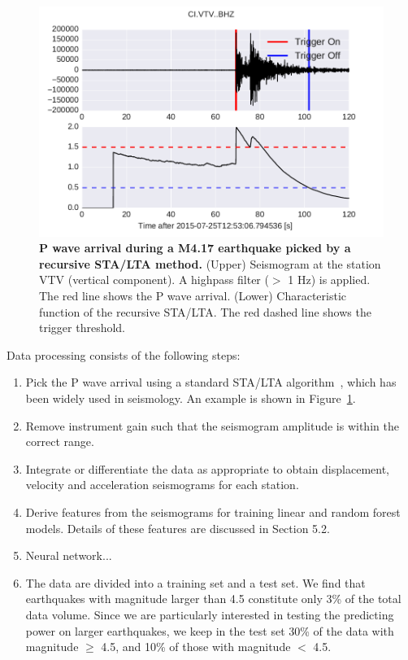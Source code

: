 \documentclass{article} %
\begin{document}
\begin{figure}[ht!]
	\centering
	\includegraphics*[scale=0.65, viewport= -25mm 0mm 500mm 100mm, angle=0]{./figure/sta_lta.pdf}
	\caption{{\bf P wave arrival during a M4.17 earthquake picked by a recursive STA/LTA method.} (Upper) Seismogram at the station VTV (vertical component). A highpass filter ($>$ 1 Hz) is applied. The red line shows the P wave arrival. (Lower) Characteristic function of the recursive STA/LTA. The red dashed line shows the trigger threshold.}\label{sta_lta} %
\end{figure}

Data processing consists of the following steps:

\begin{enumerate}
\item Pick the P wave arrival using a standard STA/LTA algorithm~\cite{Withers1998}, which has been widely used in seismology. An example is shown in Figure~\ref{sta_lta}. 
\item Remove instrument gain such that the seismogram amplitude is within the correct range.
\item Integrate or differentiate the data as appropriate to obtain displacement, velocity and acceleration seismograms for each station.
\item Derive features from the seismograms for training linear and random forest models. Details of these features are discussed in Section 5.2.   

\item Neural network...

\item The data are divided into a training set and a test set. We find that earthquakes with magnitude larger than 4.5 constitute only 3\% of the total data volume. Since we are particularly interested in testing the predicting power on larger earthquakes, we keep in the test set 30\% of the data with magnitude $\geq$ 4.5, and 10\% of those with magnitude $<$ 4.5.

\end{enumerate}
\end{document}

